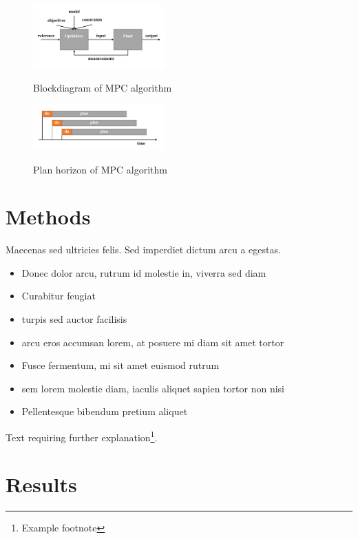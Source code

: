 \documentclass[twoside,twocolumn]{article}
\begin{document}
\begin{figure}[h]
    \caption{Blockdiagram of MPC algorithm}
    \centering
    \includegraphics[width=0.45\textwidth]{fig_mpc.pdf}
    \label{fig:mpc}
\end{figure}

\begin{figure}[h]
    \caption{Plan horizon of MPC algorithm}
    \centering
    \includegraphics[width=0.45\textwidth]{fig_mpc_plan.pdf}
    \label{fig:mpc_plan}
\end{figure}


\section{Methods}

Maecenas sed ultricies felis. Sed imperdiet dictum arcu a egestas.
\begin{itemize}
\item Donec dolor arcu, rutrum id molestie in, viverra sed diam
\item Curabitur feugiat
\item turpis sed auctor facilisis
\item arcu eros accumsan lorem, at posuere mi diam sit amet tortor
\item Fusce fermentum, mi sit amet euismod rutrum
\item sem lorem molestie diam, iaculis aliquet sapien tortor non nisi
\item Pellentesque bibendum pretium aliquet
\end{itemize}
\blindtext %

Text requiring further explanation\footnote{Example footnote}.


\section{Results}
\end{document}
